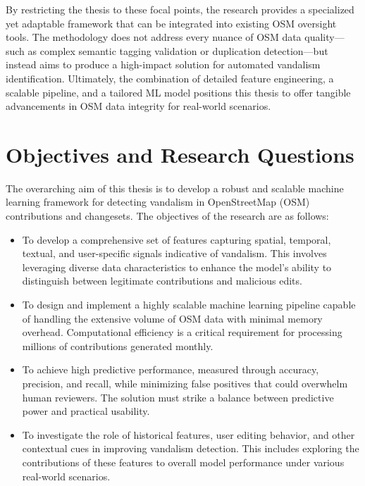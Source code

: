 \documentclass[
    13pt, %
    a4paper, %
    DIV14, %
    listof=totoc, %
    bibliography=totoc, %
    index=totoc, %
    headsepline
]{scrreprt}
\begin{document}
By restricting the thesis to these focal points, the research provides a specialized yet adaptable framework that can be integrated into existing OSM oversight tools. The methodology does not address every nuance of OSM data quality—such as complex semantic tagging validation or duplication detection—but instead aims to produce a high-impact solution for automated vandalism identification. Ultimately, the combination of detailed feature engineering, a scalable pipeline, and a tailored ML model positions this thesis to offer tangible advancements in OSM data integrity for real-world scenarios.


\section{Objectives and Research Questions}

The overarching aim of this thesis is to develop a robust and scalable machine learning framework for detecting vandalism in OpenStreetMap (OSM) contributions and changesets. The objectives of the research are as follows:

\begin{itemize}
  \item To develop a comprehensive set of features capturing spatial, temporal, textual, and user-specific signals indicative of vandalism. This involves leveraging diverse data characteristics to enhance the model’s ability to distinguish between legitimate contributions and malicious edits.

  \item To design and implement a highly scalable machine learning pipeline capable of handling the extensive volume of OSM data with minimal memory overhead. Computational efficiency is a critical requirement for processing millions of contributions generated monthly.

  \item To achieve high predictive performance, measured through accuracy, precision, and recall, while minimizing false positives that could overwhelm human reviewers. The solution must strike a balance between predictive power and practical usability.

  \item  To investigate the role of historical features, user editing behavior, and other contextual cues in improving vandalism detection. This includes exploring the contributions of these features to overall model performance under various real-world scenarios.
\end{itemize}
\end{document}
